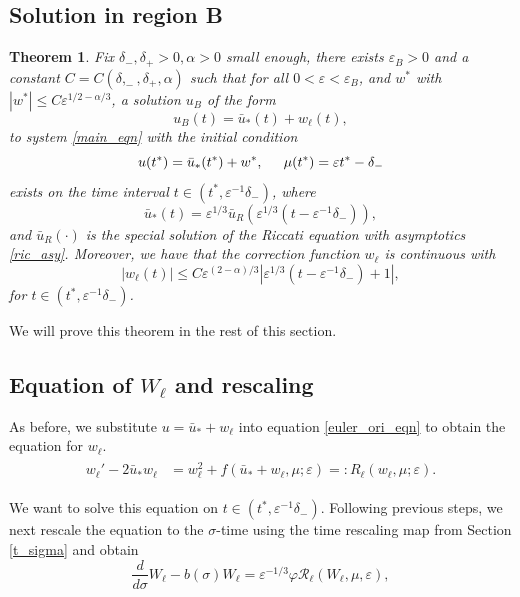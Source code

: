 \documentclass[letterpaper,11pt]{article}
\newcommand{\Ral}{\mathcal{R}}
\newcommand{\eps}{\varepsilon}
\numberwithin{equation}{section}
\theoremstyle{plain}
\newtheorem{theorem}{Theorem}[section]
\begin{document}
\subsection{Solution in region B}

\begin{theorem}\label{thm:l}
Fix $\delta_-, \delta_+>0, \alpha>0$ small enough, there exists $\eps_B>0$ and a constant $C=C(\delta,_-,\delta_+,\alpha)$ such that for all $0<\eps <\eps_B$, and $w^*$ with $|w^*| \le  C\eps^{1/2-\alpha/3}$, a solution $u_B$ of the form 
\begin{equation}
u_B(t) = \bar{u}_*(t) + w_\ell(t),
\end{equation}
to system \eqref{main_eqn} with the initial condition
\begin{equation}\label{ul_ic}
u(t^*) = \bar{u}_*(t^*) + w^*, \hspace{0.2in}\mu(t^*) = \eps t^* -\delta_-
\end{equation}
exists on the time interval $t \in (t^*, \eps^{-1}\delta_-)$, where 
\[
\bar{u}_*(t) = \eps^{1/3}\bar{u}_R(\eps^{1/3}(t-\eps^{-1}\delta_-)),
\] 
and $\bar{u}_R(\cdot)$ is the special solution of the Riccati equation with asymptotics \eqref{ric_asy}. Moreover, we have that the correction function $w_\ell$ is continuous with
\begin{equation}\label{thm:l_1}
|w_\ell(t)| \le C\eps^{(2-\alpha)/3} | \eps^{1/3}(t-\eps^{-1}\delta_-)+1|,
\end{equation}
for $t \in (t^*, \eps^{-1}\delta_-)$.
\end{theorem}

We will prove this theorem in the rest of this section.
\subsection{Equation of \texorpdfstring{$W_{\ell}$}{Well} and rescaling}

As before, we substitute $u=\bar{u}_*+w_\ell$ into equation \eqref{euler_ori_eqn} to obtain the equation for $w_\ell$.
\begin{align}\label{Eqn_wl}
\begin{split}
w_{\ell}' -2\bar{u}_* w_\ell &= w_\ell^2 + f(\bar{u}_*+w_\ell, \mu; \eps) =: R_\ell(w_\ell,\mu;\eps).
\end{split}
\end{align}

We want to solve this equation on $t\in (t^*, \eps^{-1}\delta_-)$. 
Following previous steps, we next rescale the equation to the $\sigma$-time using the time rescaling map from Section \ref{t_sigma} and obtain
\begin{equation}\label{rescl_wl}
\frac{d}{d\sigma} W_\ell - b(\sigma)W_\ell = \eps^{-1/3}\varphi \Ral_\ell(W_\ell,\mu,\eps),
\end{equation}
\end{document}
